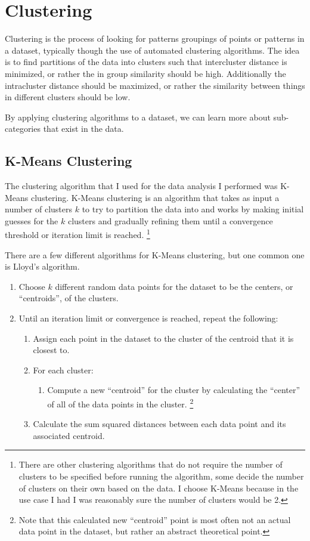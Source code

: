 \documentclass[]{article}
\begin{document}
\newpage

\section{Clustering}

Clustering is the process of looking for patterns groupings of points or patterns in a dataset, typically though the use of automated clustering algorithms. The idea is to find partitions of the data into clusters such that intercluster distance is minimized, or rather the in group similarity should be high. Additionally the intracluster distance should be maximized, or rather the similarity between things in different clusters should be low. \cite{jain_2010}

By applying clustering algorithms to a dataset, we can learn more about sub-categories that exist in the data. \cite{jain_2010}

\subsection{K-Means Clustering}

The clustering algorithm that I used for the data analysis I performed was K-Means clustering. K-Means clustering is an algorithm that takes as input a number of clusters $k$ to try to partition the data into and works by making initial guesses for the $k$ clusters and gradually refining them until a convergence threshold or iteration limit is reached. \footnote{There are other clustering algorithms that do not require the number of clusters to be specified before running the algorithm, some decide the number of clusters on their own based on the data. I choose K-Means because in the use case I had I was reasonably sure the number of clusters would be 2.} \cite{jain_2010}

There are a few different algorithms for K-Means clustering, but one common one is Lloyd’s algorithm. \cite{arthur_2007}

\begin{enumerate}
	\item Choose $k$ different random data points for the dataset to be the centers, or ``centroids'', of the clusters.
	\item Until an iteration limit or convergence is reached, repeat the following:
	\begin{enumerate}
		\item Assign each point in the dataset to the cluster of the centroid that it is closest to.
		\item For each cluster:
		\begin{enumerate}
			\item Compute a new ``centroid'' for the cluster by calculating the ``center'' of all of the data points in the cluster. \footnote{Note that this calculated new ``centroid'' point is most often not an actual data point in the dataset, but rather an abstract theoretical point.}
		\end{enumerate}
		\item Calculate the sum squared distances between each data point and its associated centroid.
	\end{enumerate}
\end{enumerate}
\end{document}
